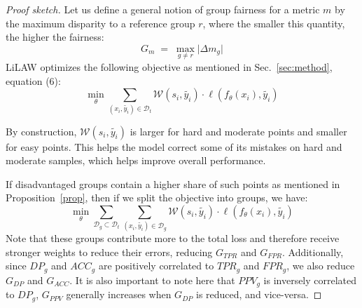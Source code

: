 \documentclass{article}
\theoremstyle{plain}
\theoremstyle{definition}
\theoremstyle{remark}
\begin{document}
\begin{proof}[Proof sketch]
Let us define a general notion of group fairness for a metric $m$ by the maximum disparity to a reference group $r$, where the smaller this quantity, the higher the fairness:
\begin{equation}
G_m \;=\; \max_{g\neq r} \big| \Delta m_g \big|
\end{equation}
LiLAW optimizes the following objective as mentioned in Sec.~\ref{sec:method}, equation (6):
\begin{equation}
    \min_{\theta} \sum_{(x_i, \widetilde{y_i}) \in \mathcal{D}_{t}}\mathcal{W}(s_i, \widetilde{y_i}) \cdot \ell(f_{\theta}(x_i), \widetilde{y_i})
\end{equation}

By construction, $\mathcal{W}(s_i, \widetilde{y_i})$ is larger for hard and moderate points and smaller for easy points. This helps the model correct some of its mistakes on hard and moderate samples, which helps improve overall performance.

If disadvantaged groups contain a higher share of such points as mentioned in Proposition~\ref{prop}, then if we split the objective into groups, we have:
\begin{equation}
\min_{\theta} \sum_{\mathcal{D}_{g} \subset \mathcal{D}_{t}}\sum_{(x_i, \widetilde{y_i}) \in \mathcal{D}_{g}}\mathcal{W}(s_i, \widetilde{y_i}) \cdot \ell(f_{\theta}(x_i), \widetilde{y_i})
\end{equation}
Note that these groups contribute more to the total loss and therefore receive stronger weights to reduce their errors, reducing $G_{TPR}$ and $G_{FPR}$. Additionally, since $DP_g$ and $ACC_g$ are positively correlated to $TPR_g$ and $FPR_g$, we also reduce $G_{DP}$ and $G_{ACC}$. It is also important to note here that $PPV_g$ is inversely correlated to $DP_g$, $G_{PPV}$ generally increases when $G_{DP}$ is reduced, and vice-versa.
\end{proof}
\end{document}
